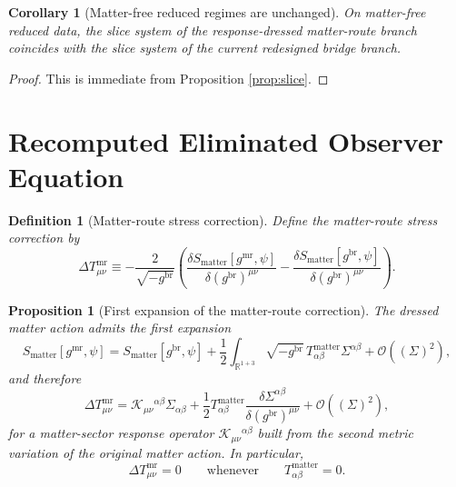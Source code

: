 \documentclass[11pt]{article}
\newcommand{\MatterMetric}{g^{\mathrm{mr}}}
\newcommand{\SigmaMR}{\Sigma}
\newcommand{\DeltaTM}{\Delta T_{\mu\nu}^{\mathrm{mr}}}
\newtheorem{definition}{Definition}
\newtheorem{proposition}{Proposition}
\newtheorem{corollary}{Corollary}
\begin{document}
\begin{corollary}[Matter-free reduced regimes are unchanged]
\label{cor:matterfree}
On matter-free reduced data, the slice system of the response-dressed matter-route branch coincides with the slice system of the current redesigned bridge branch.
\end{corollary}

\begin{proof}
This is immediate from Proposition \ref{prop:slice}.
\end{proof}

\section{Recomputed Eliminated Observer Equation}

\begin{definition}[Matter-route stress correction]
\label{def:deltat}
Define the \emph{matter-route stress correction} by
\begin{equation}
\DeltaTM
\equiv
-\frac{2}{\sqrt{-g^{\mathrm{br}}}}
\left(
\frac{\delta S_{\mathrm{matter}}[\MatterMetric,\psi]}{\delta (g^{\mathrm{br}})^{\mu\nu}}
-\frac{\delta S_{\mathrm{matter}}[g^{\mathrm{br}},\psi]}{\delta (g^{\mathrm{br}})^{\mu\nu}}
\right).
\label{eq:deltat}
\end{equation}
\end{definition}

\begin{proposition}[First expansion of the matter-route correction]
\label{prop:expansion}
The dressed matter action admits the first expansion
\begin{equation}
S_{\mathrm{matter}}[\MatterMetric,\psi]
=
S_{\mathrm{matter}}[g^{\mathrm{br}},\psi]
+\frac12
\int_{\mathbb R^{1+3}}
\sqrt{-g^{\mathrm{br}}}\,
T_{\alpha\beta}^{\mathrm{matter}}\SigmaMR^{\alpha\beta}
+\mathcal O\!\left((\SigmaMR)^2\right),
\label{eq:expand}
\end{equation}
and therefore
\begin{equation}
\DeltaTM
=
\mathcal K_{\mu\nu}{}^{\alpha\beta}\SigmaMR_{\alpha\beta}
+\frac12
T_{\alpha\beta}^{\mathrm{matter}}
\frac{\delta \SigmaMR^{\alpha\beta}}{\delta (g^{\mathrm{br}})^{\mu\nu}}
+\mathcal O\!\left((\SigmaMR)^2\right),
\label{eq:deltat2}
\end{equation}
for a matter-sector response operator \(\mathcal K_{\mu\nu}{}^{\alpha\beta}\) built from the second metric variation of the original matter action. In particular,
\begin{equation}
\DeltaTM=0
\qquad
\text{whenever}
\qquad
T_{\alpha\beta}^{\mathrm{matter}}=0.
\label{eq:vacvanish}
\end{equation}
\end{proposition}
\end{document}
